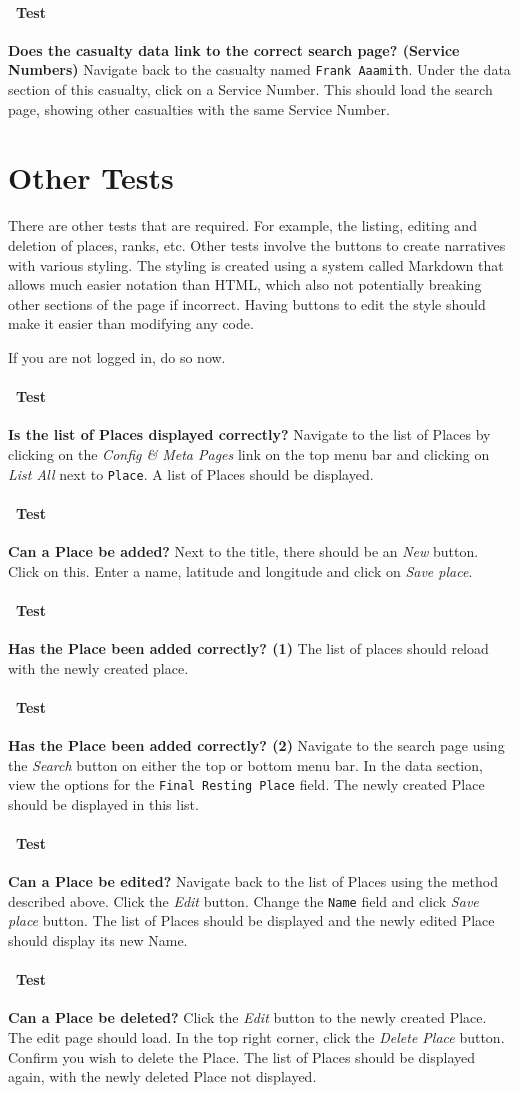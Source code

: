 \documentclass[12pt]{article}
\newcounter{Test}
\newcommand{\test}[1]{%
\stepcounter{Test}%
\paragraph{\Circle\ Test \theTest} \textbf{#1} }
\begin{document}
\test{Does the casualty data link to the correct search page? (Service Numbers)}
Navigate back to the casualty named \texttt{Frank Aaamith}. Under the data section of this casualty, click on a Service Number. This should load the search page, showing other casualties with the same Service Number.

\section{Other Tests}\label{sec:other}

There are other tests that are required. For example, the listing, editing and deletion of places, ranks, etc. Other tests involve the buttons to create narratives with various styling. The styling is created using a system called Markdown that allows much easier notation than HTML, which also not potentially breaking other sections of the page if incorrect. Having buttons to edit the style should make it easier than modifying any code.

If you are not logged in, do so now.

\test{Is the list of Places displayed correctly?}
Navigate to the list of Places by clicking on the \textit{Config \& Meta Pages} link on the top menu bar and clicking on \textit{List All} next to \texttt{Place}. A list of Places should be displayed.

\test{Can a Place be added?}
Next to the title, there should be an \textit{New} button. Click on this. Enter a name, latitude and longitude and click on \textit{Save place}.

\test{Has the Place been added correctly? (1)}
The list of places should reload with the newly created place.

\test{Has the Place been added correctly? (2)}
Navigate to the search page using the \textit{Search} button on either the top or bottom menu bar. In the data section, view the options for the \texttt{Final Resting Place} field. The newly created Place should be displayed in this list.

\test{Can a Place be edited?}
Navigate back to the list of Places using the method described above. Click the \textit{Edit} button. Change the \texttt{Name} field and click \textit{Save place} button. The list of Places should be displayed and the newly edited Place should display its new Name.

\test{Can a Place be deleted?}
Click the \textit{Edit} button to the newly created Place. The edit page should load. In the top right corner, click the \textit{Delete Place} button. Confirm you wish to delete the Place. The list of Places should be displayed again, with the newly deleted Place not displayed.
\end{document}
